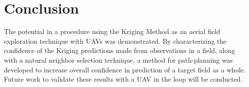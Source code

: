 \chapter{Conclusion}
The potential in a procedure using the Kriging Method as an aerial field exploration technique with UAVs was demonstrated. By characterizing the confidence of the Kriging predictions made from observations in a field, along with a natural neighbor selection technique, a method for path-planning was developed to increase overall confidence in prediction of a target field as a whole. Future work to validate these results with a UAV in the loop will be conducted.